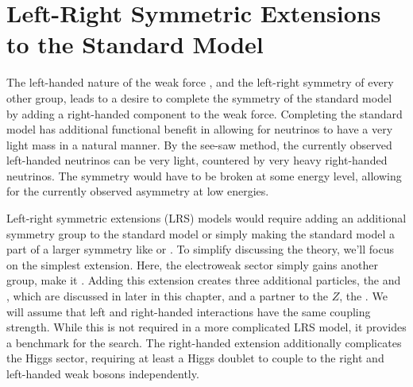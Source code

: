\section{Left-Right Symmetric Extensions to the Standard Model}
\label{sec:LRStheory}
The left-handed nature of the weak force \SUtwoL, and the left-right symmetry of every other group, leads to a desire to complete the symmetry of the standard model by adding a right-handed component to the weak force.  Completing the standard model has additional functional benefit in allowing for neutrinos to have a very light mass in a natural manner.  By the see-saw method, the currently observed left-handed neutrinos can be very light, countered by very heavy right-handed neutrinos. The symmetry would have to be broken at some energy level, allowing for the currently observed asymmetry at low energies.

Left-right symmetric extensions (LRS) models would require adding an additional symmetry group to the standard model or simply making the standard model a part of a larger symmetry like \SUfive or \Oten.  To simplify discussing the theory, we'll focus on the simplest extension.  Here, the electroweak sector simply gains another \SUtwo group, make it \SUlrs. Adding this extension creates three additional particles, the \WR and \NR, which are discussed in later in this chapter, and a partner to the \ensuremath{Z}, the \Zprime.  We will assume that left and right-handed interactions have the same coupling strength.  While this is not required in a more complicated LRS model, it provides a benchmark for the search. The right-handed extension additionally complicates the Higgs sector, requiring at least a Higgs doublet to couple to the right and left-handed weak bosons independently.


